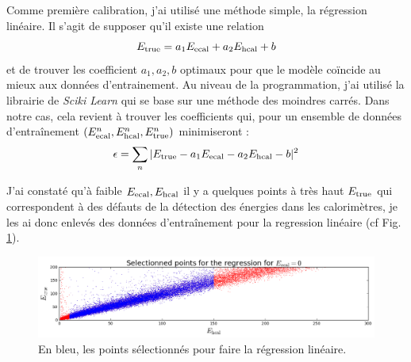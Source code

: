 \documentclass[11pt,a4paper]{article}
\begin{document}
Comme première calibration, j'ai utilisé une méthode simple, la régression linéaire. Il s'agit de supposer qu'il existe une relation 
\begin{equation}
    E_{\rm true} = a_1 E_{\rm ecal} + a_2 E_{\rm hcal} + b
\end{equation}
et de trouver les coefficient $a_1, a_2,  b$ optimaux pour que le modèle coïncide au mieux aux données d'entrainement. Au niveau de la programmation, j'ai utilisé la librairie de \textit{Sciki Learn}  \cite{scikitLR} qui se base sur une méthode des moindres carrés. Dans notre cas, cela revient à trouver les coefficients qui, pour un ensemble de données d'entraînement  $(E_{\rm ecal}^n,E_{\rm hcal}^n, E_{\rm true}^n)$ minimiseront :
\begin{equation}
	\epsilon = \sum_n |E_{\rm true} - a_1 E_{\rm ecal} - a_2 E_{\rm hcal} - b|^2
\end{equation}

J'ai constaté qu'à faible  $E_{\rm ecal},  E_{\rm hcal}$ il y a quelques points à très haut $E_{\rm true}$ qui correspondent à des défauts de la détection des énergies dans les calorimètres, je les ai donc enlevés des données d'entraînement pour la regression linéaire (cf Fig. \ref{selectedpoints}).

\begin{figure}[!h]
    \begin{center}
        \includegraphics[width=\textwidth]{images/pictures/testLinearRegression/LinearRegression_selectedpoints.png}
        \caption{En bleu, les points sélectionnés pour faire la régression linéaire.}
        \label{selectedpoints}
    \end{center}
\end{figure}
\end{document}
